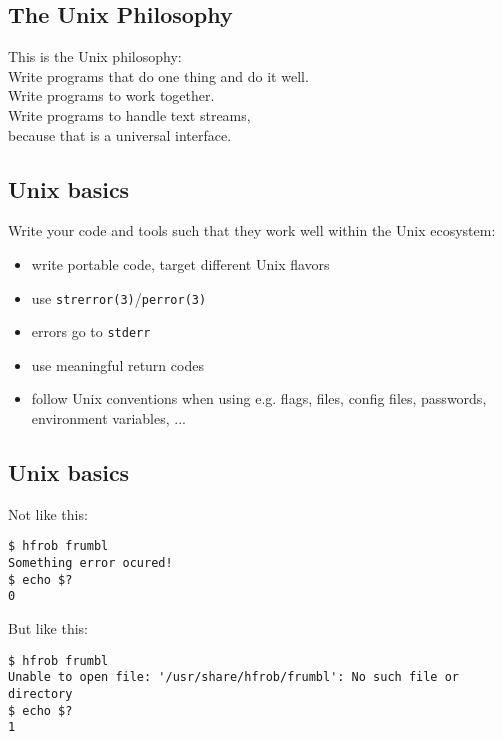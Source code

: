 \documentclass[xga]{xdvislides}
\begin{document}
\subsection{The Unix Philosophy}
\begin{center}
\begin{em}
This is the Unix philosophy:\\
\vspace{.5in}
Write programs that do one thing and do it well. \\

\vspace{.5in}
Write programs to work together. \\

\vspace{.5in}
Write programs to handle text streams,\\
because that is a universal interface.
\end{em}
\end{center}

\subsection{Unix basics}
Write your code and tools such that they work well
within the Unix ecosystem:
\begin{itemize}
	\item write portable code, target different Unix flavors
	\item use \verb+strerror(3)+/\verb+perror(3)+
	\item errors go to \verb+stderr+
	\item use meaningful return codes
	\item follow Unix conventions when using e.g. flags, files, config files, passwords, environment variables, ...
\end{itemize}

\subsection{Unix basics}
Not like this:
\begin{verbatim}
$ hfrob frumbl
Something error ocured!
$ echo $?
0
\end{verbatim}
\vspace{.5in}
But like this:
\begin{verbatim}
$ hfrob frumbl
Unable to open file: '/usr/share/hfrob/frumbl': No such file or directory
$ echo $?
1
\end{verbatim}
\end{document}
